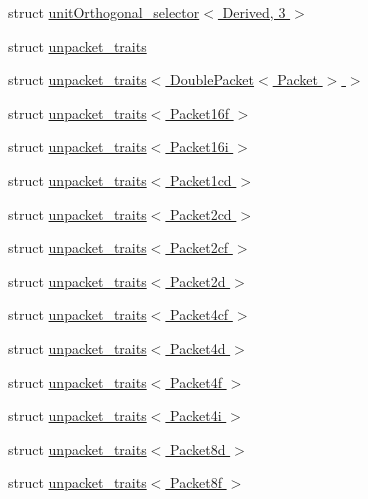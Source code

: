 \begin{DoxyCompactItemize}
\item 
struct \hyperlink{struct_eigen_1_1internal_1_1unit_orthogonal__selector_3_01_derived_00_013_01_4}{unit\+Orthogonal\+\_\+selector$<$ Derived, 3 $>$}
\item 
struct \hyperlink{struct_eigen_1_1internal_1_1unpacket__traits}{unpacket\+\_\+traits}
\item 
struct \hyperlink{struct_eigen_1_1internal_1_1unpacket__traits_3_01_double_packet_3_01_packet_01_4_01_4}{unpacket\+\_\+traits$<$ Double\+Packet$<$ Packet $>$ $>$}
\item 
struct \hyperlink{struct_eigen_1_1internal_1_1unpacket__traits_3_01_packet16f_01_4}{unpacket\+\_\+traits$<$ Packet16f $>$}
\item 
struct \hyperlink{struct_eigen_1_1internal_1_1unpacket__traits_3_01_packet16i_01_4}{unpacket\+\_\+traits$<$ Packet16i $>$}
\item 
struct \hyperlink{struct_eigen_1_1internal_1_1unpacket__traits_3_01_packet1cd_01_4}{unpacket\+\_\+traits$<$ Packet1cd $>$}
\item 
struct \hyperlink{struct_eigen_1_1internal_1_1unpacket__traits_3_01_packet2cd_01_4}{unpacket\+\_\+traits$<$ Packet2cd $>$}
\item 
struct \hyperlink{struct_eigen_1_1internal_1_1unpacket__traits_3_01_packet2cf_01_4}{unpacket\+\_\+traits$<$ Packet2cf $>$}
\item 
struct \hyperlink{struct_eigen_1_1internal_1_1unpacket__traits_3_01_packet2d_01_4}{unpacket\+\_\+traits$<$ Packet2d $>$}
\item 
struct \hyperlink{struct_eigen_1_1internal_1_1unpacket__traits_3_01_packet4cf_01_4}{unpacket\+\_\+traits$<$ Packet4cf $>$}
\item 
struct \hyperlink{struct_eigen_1_1internal_1_1unpacket__traits_3_01_packet4d_01_4}{unpacket\+\_\+traits$<$ Packet4d $>$}
\item 
struct \hyperlink{struct_eigen_1_1internal_1_1unpacket__traits_3_01_packet4f_01_4}{unpacket\+\_\+traits$<$ Packet4f $>$}
\item 
struct \hyperlink{struct_eigen_1_1internal_1_1unpacket__traits_3_01_packet4i_01_4}{unpacket\+\_\+traits$<$ Packet4i $>$}
\item 
struct \hyperlink{struct_eigen_1_1internal_1_1unpacket__traits_3_01_packet8d_01_4}{unpacket\+\_\+traits$<$ Packet8d $>$}
\item 
struct \hyperlink{struct_eigen_1_1internal_1_1unpacket__traits_3_01_packet8f_01_4}{unpacket\+\_\+traits$<$ Packet8f $>$}
\item 

\end{DoxyCompactItemize}
